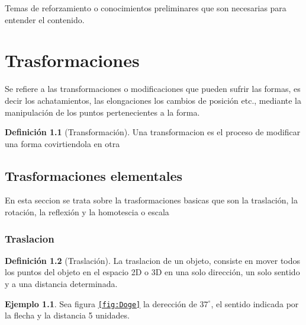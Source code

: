 \documentclass[
  16pt,
]{krantz}
\theoremstyle{definition}
\newtheorem{definition}{Definición}[chapter]
\theoremstyle{definition}
\newtheorem{example}{Ejemplo}[chapter]
\theoremstyle{definition}
\theoremstyle{definition}
\theoremstyle{remark}
\begin{document}
\hypertarget{appendix-apendice}{%
\appendix {}}


Temas de reforzamiento o conocimientos preliminares que son necesarias para entender el contenido.

\hypertarget{trasformaciones}{%
\chapter{Trasformaciones}\label{trasformaciones}}

Se refiere a las transformaciones o modificaciones que pueden sufrir las formas, es decir los achatamientos, las elongaciones los cambios de posición etc., mediante la manipulación de los puntos pertenecientes a la forma.

\begin{definition}[Transformación]
\protect\hypertarget{def:transformacion}{}{\label{def:transformacion} {} }Una transformacion es el proceso de modificar una forma covirtiendola en otra
\end{definition}

\hypertarget{trasformaciones-elementales}{%
\section{Trasformaciones elementales}\label{trasformaciones-elementales}}

En esta seccion se trata sobre la trasformaciones basicas que son la traslación, la rotación, la reflexión y la homotescia o escala

\hypertarget{traslacion}{%
\subsection{Traslacion}\label{traslacion}}

\begin{definition}[Traslación]
\protect\hypertarget{def:traslacion}{}{\label{def:traslacion} {} }La traslacion de un objeto, consiste en mover todos los puntos del objeto en el espacio 2D o 3D en una solo dirección, un solo sentido y a una distancia determinada.
\end{definition}

\begin{example}
\protect\hypertarget{exm:unnamed-chunk-2}{}{\label{exm:unnamed-chunk-2} }Sea figura \texttt{\ref{fig:Doge}} la derección de \(37^\circ\), el sentido indicada por la flecha y la distancia 5 unidades.
\end{example}
\end{document}
